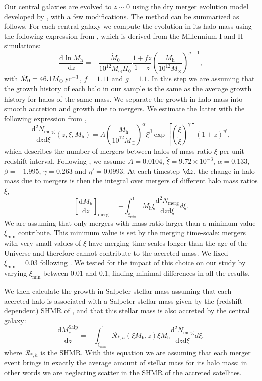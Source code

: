 \documentclass[usenatbib]{mnras}
\def\mhalo{M_{\mathrm{h}}}
\def\ximin{\xi_{\mathrm{min}}}
\def\msalp{M_*^{\mathrm{Salp}}}
\begin{document}
Our central galaxies are evolved to $z\sim0$ using the dry merger evolution model developed by \citet{Nip++12}, with a few modifications.
The method can be summarized as follows.
For each central galaxy we compute the evolution in its halo mass  using the following expression from \citet{FMB10}, which is derived from the Millennium I and II simulations:
\begin{equation}
\frac{\mathrm{d}\ln{\mhalo}}{\mathrm{d}z} = - \frac{\dot{M}_0}{10^{12}M_\odot H_0}\frac{1 + fz}{1 + z}\left(\frac{\mhalo}{10^{12}M_\odot}\right)^{g-1},
\end{equation}
with $\dot{M}_0 = 46.1 M_\odot \rm{\, yr}^{-1}$, $f=1.11$ and $g=1.1$.
In this step we are assuming that the growth history of each halo in our sample is the same as the average growth history for halos of the same mass.
We separate the growth in halo mass into smooth accretion and growth due to mergers. We estimate the latter with the following expression from \citet{FMB10},
\begin{equation}\label{eq:nmerg}
\frac{\mathrm{d}^2N_{\mathrm{merg}}}{\mathrm{d}z \mathrm{d}\xi}(z, \xi, \mhalo) = A\left(\frac{\mhalo}{10^{12}M_\odot}\right)^\alpha \xi ^\beta \exp{\left[\left(\frac{\xi}{\tilde{\xi}}\right)^\gamma\right]}(1 + z)^{\eta'},
\end{equation}
which describes the number of mergers between halos of mass ratio
$\xi$ per unit redshift interval.  Following \citet{FMB10}, we assume
$A=0.0104$, $\tilde{\xi}=9.72\times10^{-3}$, $\alpha=0.133$,
$\beta=-1.995$, $\gamma=0.263$ and $\eta'=0.0993$.  At each timestep
$\d z$, the change in halo mass due to mergers is then the integral
over mergers of different halo mass ratios $\xi$,
\begin{equation}
\left[\frac{\mathrm{d}\mhalo}{\mathrm{d}z}\right]_{\mathrm{merg}} = -\int_{\ximin}^1 \mhalo\xi \frac{\mathrm{d}^2N_{\mathrm{merg}}}{\mathrm{d}z \mathrm{d}\xi} d\xi.
\end{equation}
We are assuming that only mergers with mass ratio larger than a
minimum value $\ximin$ contribute. This minimum value is set by the
merging time-scale: mergers with very small values of $\xi$ have
merging time-scales longer than the age of the Universe and therefore
cannot contribute to the accreted mass. We fixed $\ximin=0.03$
following \citet{Nip++12}. We tested for the impact of this choice on
our study by varying $\ximin$ between $0.01$ and $0.1$, finding
minimal differences in all the results.

We then calculate the growth in Salpeter stellar mass assuming that
each accreted halo is associated with a Salpeter stellar mass
  given by the (redshift dependent) SHMR of \citet{Lea++12}, and that this stellar
mass is also accreted by the central galaxy:
\begin{equation}
\frac{\mathrm{d}\msalp}{\mathrm{d}z} = -\int_{\ximin}^1 \mathcal{R}_{*,h}(\xi \mhalo, z)\xi\mhalo\frac{\mathrm{d}^2N_{\mathrm{merg}}}{\mathrm{d}z \mathrm{d}\xi} d\xi,
\end{equation}
where
$\mathcal{R}_{*,h}$ is the SHMR. With this equation we are assuming
that each merger event brings in exactly the average amount of stellar
mass for its halo mass: in other words we are neglecting scatter
  in the SHMR of the accreted satellites.
\end{document}
